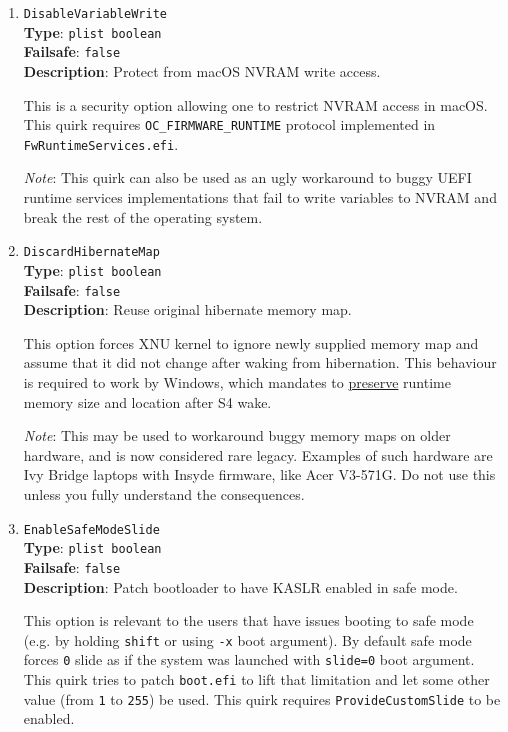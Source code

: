 \documentclass[]{article}
\begin{document}
\begin{enumerate}
\item
  \texttt{DisableVariableWrite}\\
  \textbf{Type}: \texttt{plist\ boolean}\\
  \textbf{Failsafe}: \texttt{false}\\
  \textbf{Description}: Protect from macOS NVRAM write access.

  This is a security option allowing one to restrict NVRAM access in macOS.
  This quirk requires \texttt{OC\_FIRMWARE\_RUNTIME} protocol implemented
  in \texttt{FwRuntimeServices.efi}.

  \emph{Note}: This quirk can also be used as an ugly workaround to buggy UEFI
  runtime services implementations that fail to write variables to NVRAM and
  break the rest of the operating system.

\item
  \texttt{DiscardHibernateMap}\\
  \textbf{Type}: \texttt{plist\ boolean}\\
  \textbf{Failsafe}: \texttt{false}\\
  \textbf{Description}: Reuse original hibernate memory map.

  This option forces XNU kernel to ignore newly supplied memory map and assume
  that it did not change after waking from hibernation. This behaviour is required
  to work by Windows, which mandates to
  \href{https://docs.microsoft.com/en-us/windows-hardware/design/device-experiences/oem-uefi#hibernation-state-s4-transition-requirements}{preserve}
  runtime memory size and location after S4 wake.

  \emph{Note}: This may be used to workaround buggy memory maps on older hardware,
  and is now considered rare legacy. Examples of such hardware are Ivy Bridge laptops
  with Insyde firmware, like Acer V3-571G. Do not use this unless you fully understand
  the consequences.

\item
  \texttt{EnableSafeModeSlide}\\
  \textbf{Type}: \texttt{plist\ boolean}\\
  \textbf{Failsafe}: \texttt{false}\\
  \textbf{Description}: Patch bootloader to have KASLR enabled in safe mode.

  This option is relevant to the users that have issues booting to safe mode
  (e.g. by holding \texttt{shift} or using \texttt{-x} boot argument). By default
  safe mode forces \texttt{0} slide as if the system was launched with \texttt{slide=0}
  boot argument. This quirk tries to patch \texttt{boot.efi} to lift that limitation
  and let some other value (from \texttt{1} to \texttt{255}) be used. This quirk requires
  \texttt{ProvideCustomSlide} to be enabled.


\end{enumerate}
\end{document}
